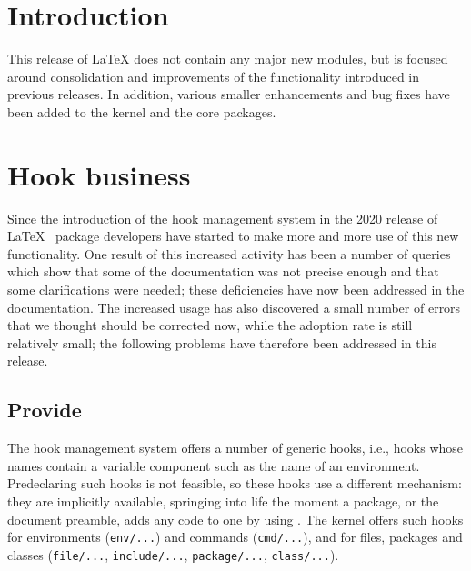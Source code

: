 \documentclass{ltnews}
\providecommand\tubcommand[1]{}
\begin{document}
\tubcommand{\addtolength\textheight{4.2pc}}   %

\maketitle
{ \spaceskip=3.33pt  \tableofcontents}

\setlength{}


\medskip


\section{Introduction}


This release of \LaTeX{} does not contain any major new modules, but
is focused around consolidation and improvements of the functionality
introduced in previous releases.  In addition, various smaller
enhancements and bug fixes have been added to the kernel and the core
packages.


\section{Hook business}

Since the introduction of the hook management system in the 2020
release of \LaTeX{}~\cite{34:ltnews32} package 
developers have started
to make more and more use of this new functionality. One result 
of this increased activity has been a
number of queries which show that some of the documentation was not
precise enough and that some clarifications were needed; these 
deficiencies have now been addressed in the documentation. 
%
The increased usage has also discovered a small number of 
errors that we thought
should be corrected now, while the adoption rate is still relatively
small; the following problems have therefore been addressed in this release.


\subsection{Provide }

The hook management system offers a number of generic hooks, i.e.,
hooks whose names contain a variable component such as the name
of an environment. Predeclaring such hooks is not feasible, 
so these hooks use a different mechanism: they are
implicitly available, springing into life the moment a package, or 
the document preamble, adds any code to one by using .  
%
The kernel offers such hooks for environments
 (\texttt{env/...}) and commands (\texttt{cmd/...}), and for files, 
 packages and classes (\texttt{file/...},
\texttt{include/...}, \texttt{package/...}, \texttt{class/...}).
\end{document}
